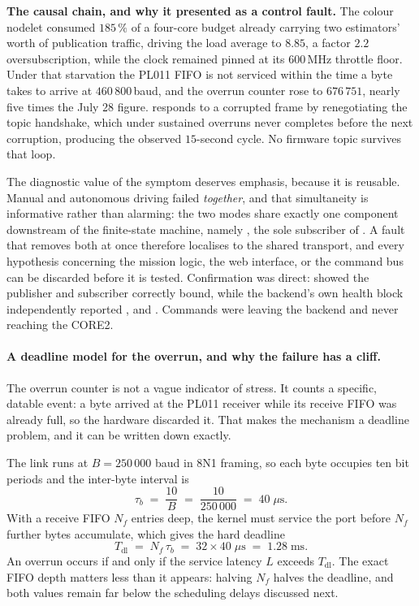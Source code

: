 \noindent\textbf{The causal chain, and why it presented as a control fault.}
The colour nodelet consumed $185\,\%$ of a four-core budget already carrying
two estimators' worth of publication traffic, driving the load average to
$8.85$, a factor $2.2$ oversubscription, while the clock remained pinned
at its $600$\,MHz throttle floor. Under that starvation the PL011 FIFO is not
serviced within the time a byte takes to arrive at $460\,800$\,baud, and the
overrun counter rose to $676\,751$, nearly five times the July 28 figure.
 responds to a corrupted frame by renegotiating the topic
handshake, which under sustained overruns never completes before the next
corruption, producing the observed $15$-second  cycle. No
firmware topic survives that loop.

The diagnostic value of the symptom deserves emphasis, because it is
reusable. Manual and autonomous driving failed \emph{together}, and that
simultaneity is informative rather than alarming: the two modes share exactly
one component downstream of the finite-state machine, namely
, the sole subscriber of . A fault that
removes both at once therefore localises to the shared transport, and every
hypothesis concerning the mission logic, the web interface, or the command
bus can be discarded before it is tested. Confirmation was direct:
 showed the publisher and subscriber correctly
bound, while the backend's own health block independently reported
,  and . Commands were
leaving the backend and never reaching the CORE2.

\paragraph{A deadline model for the overrun, and why the failure has a
cliff.}
The overrun counter is not a vague indicator of stress. It counts a specific,
datable event: a byte arrived at the PL011 receiver while its receive FIFO was
already full, so the hardware discarded it. That makes the mechanism a
deadline problem, and it can be written down exactly.

The link runs at $B = 250\,000$ baud in 8N1 framing, so each byte occupies ten
bit periods and the inter-byte interval is
\begin{equation}
\tau_b \;=\; \frac{10}{B} \;=\; \frac{10}{250\,000} \;=\; 40\;\mu\text{s}.
\label{eq:bytetime}
\end{equation}
With a receive FIFO $N_f$ entries deep, the kernel must service the port
before $N_f$ further bytes accumulate, which gives the hard deadline
\begin{equation}
T_{\mathrm{dl}} \;=\; N_f\,\tau_b \;=\; 32 \times 40\;\mu\text{s}
              \;=\; 1.28\;\text{ms}.
\label{eq:fifodeadline}
\end{equation}
An overrun occurs if and only if the service latency $L$ exceeds
$T_{\mathrm{dl}}$. The exact FIFO depth matters less than it appears: halving
$N_f$ halves the deadline, and both values remain far below the scheduling
delays discussed next.

